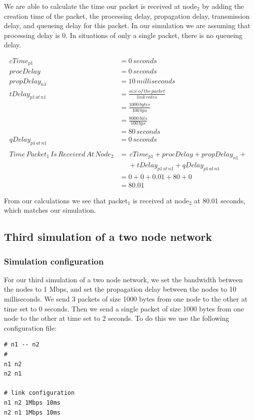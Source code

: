 \documentclass[fleqn,11pt]{article}
\begin{document}
We are able to calculate the time our packet is received at node$_2$ by adding the creation time of the packet, the processing delay, propagation delay, transmission delay, and queueing delay for this packet. In our simulation we are assuming that processing delay is 0. In situations of only a single packet, there is no queueing delay.

\begin{align*}
cTime_{p1} &= 0\,seconds\\
procDelay &= 0\,seconds\\
propDelay_{n1} &=10\,milliseconds\\
tDelay_{p1\,at\,n1} &=  \frac{size\,of\,the\,packet} {link\,rates}\\
&= \frac{1000\,bytes}{100\,bps}\\
&=  \frac{8000\,bits}{100\,bps}\\
&= 80\,seconds\\
qDelay_{p1\,at\,n1} &= 0\,seconds\\
\\
Time\,Packet_{1}\,Is\,Received\,At\,Node_{2} &= \,cTime_{p1} + procDelay + propDelay_{n1} +\\
&\,\,\,\,\,\,\,\, + tDelay_{p1\,at\,n1} + qDelay_{p1\,at\,n1} \\
&= 0 + 0 + 0.01 + 80 + 0 \\
&= 80.01 
\end{align*}

From our calculations we see that packet$_1$ is received at node$_2$ at 80.01 seconds, which matches our simulation.

 \subsection{Third simulation of a two node network}
\subsubsection{Simulation configuration}
For our third simulation of a two node network, we set the bandwidth between the nodes to 1 Mbps, and set the propagation delay between the nodes to 10 milliseconds. We send 3 packets of size 1000 bytes from one node to the other at time set to 0 seconds. Then we send a single packet of size 1000 bytes from one node to the other at time set to 2 seconds. To do this we use the following configuration file:

\begin{lstlisting}
# n1 -- n2
#
n1 n2
n2 n1

# link configuration
n1 n2 1Mbps 10ms
n2 n1 1Mbps 10ms

\end{lstlisting}
\end{document}
